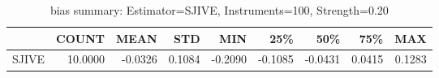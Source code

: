 \begin{table}[ht]
\centering
\caption{bias summary: Estimator=SJIVE, Instruments=100, Strength=0.20}
\begin{tabular}{lrrrrrrrr}
\toprule
 & COUNT & MEAN & STD & MIN & 25\% & 50\% & 75\% & MAX \\
\midrule
SJIVE & 10.0000 & -0.0326 & 0.1084 & -0.2090 & -0.1085 & -0.0431 & 0.0415 & 0.1283 \\
\bottomrule
\end{tabular}
\end{table}
